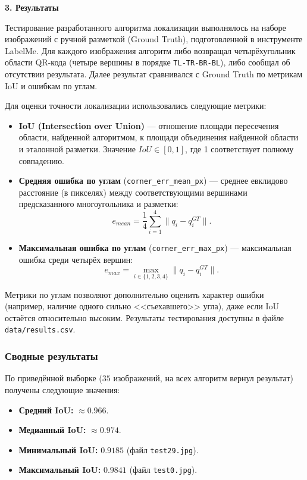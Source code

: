 \newpage
\begin{center}
	\textbf{\large 3. Результаты}
\end{center}

Тестирование разработанного алгоритма локализации выполнялось на наборе изображений с ручной разметкой (Ground Truth), подготовленной в инструменте LabelMe.
Для каждого изображения алгоритм либо возвращал четырёхугольник области QR-кода (четыре вершины в порядке \texttt{TL-TR-BR-BL}), либо сообщал об отсутствии результата.
Далее результат сравнивался с Ground Truth по метрикам IoU и ошибкам по углам.

Для оценки точности локализации использовались следующие метрики:

\begin{itemize}
	\item \textbf{IoU (Intersection over Union)} --- отношение площади пересечения области, найденной алгоритмом, к площади объединения найденной области и эталонной разметки.
	      Значение $IoU \in [0, 1]$, где 1 соответствует полному совпадению.
	\item \textbf{Средняя ошибка по углам} (\texttt{corner\_err\_mean\_px}) --- среднее евклидово расстояние (в пикселях) между соответствующими вершинами предсказанного многоугольника и разметки:
	      \[
		      e_{mean}=\frac{1}{4}\sum_{i=1}^{4} \|q_i - q_i^{GT}\|.
	      \]
	\item \textbf{Максимальная ошибка по углам} (\texttt{corner\_err\_max\_px}) --- максимальная ошибка среди четырёх вершин:
	      \[
		      e_{max}=\max_{i\in\{1,2,3,4\}} \|q_i - q_i^{GT}\|.
	      \]
\end{itemize}

Метрики по углам позволяют дополнительно оценить характер ошибки (например, наличие одного сильно <<съехавшего>> угла), даже если IoU остаётся относительно высоким.
Результаты тестирования доступны в файле \texttt{data/results.csv}.

\subsubsection{Сводные результаты}
По приведённой выборке ($35$ изображений, на всех алгоритм вернул результат) получены следующие значения:
\begin{itemize}
	\item \textbf{Средний IoU:} $\approx 0.966$.
	\item \textbf{Медианный IoU:} $\approx 0.974$.
	\item \textbf{Минимальный IoU:} $0.9185$ (файл \texttt{test29.jpg}).
	\item \textbf{Максимальный IoU:} $0.9841$ (файл \texttt{test0.jpg}).
\end{itemize}

